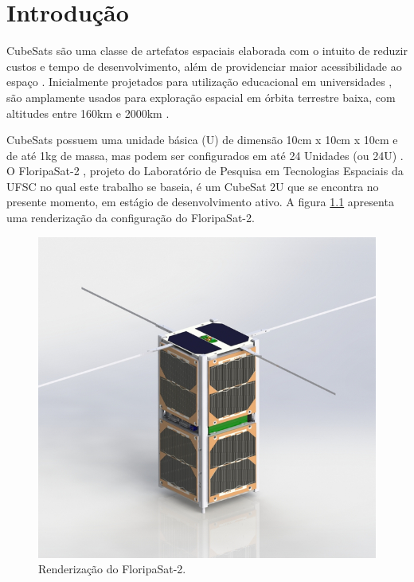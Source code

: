 \chapter{Introdução}
CubeSats são uma classe de artefatos espaciais elaborada com o intuito de reduzir custos e tempo de desenvolvimento,
além de providenciar maior acessibilidade ao espaço \cite{cubesat-spec}. Inicialmente projetados para utilização
educacional em universidades \cite{burt2011}, são amplamente usados para exploração espacial em órbita terrestre
baixa, com altitudes entre 160km e 2000km \cite{alanazi2019}.

CubeSats possuem uma unidade básica (U) de dimensão 10cm x 10cm x 10cm e de até 1kg de massa, mas podem ser configurados
em até 24 Unidades (ou 24U) \cite{cubesat}. O FloripaSat-2 \cite{floripasat2}, projeto do Laboratório de Pesquisa em
Tecnologias Espaciais da UFSC no qual este trabalho se baseia, é um CubeSat 2U que se encontra no presente momento,
em estágio de desenvolvimento ativo. A figura \ref{fig:floripasat2-diagram} apresenta uma renderização da configuração
do FloripaSat-2.

\begin{figure}[H]
\caption{\label{fig:floripasat2-diagram}Renderização do FloripaSat-2.}
\begin{center}
\includegraphics[scale=0.5]{images/floripasat-2-diagram.jpg}
\end{center}
\end{figure}
\newpage

